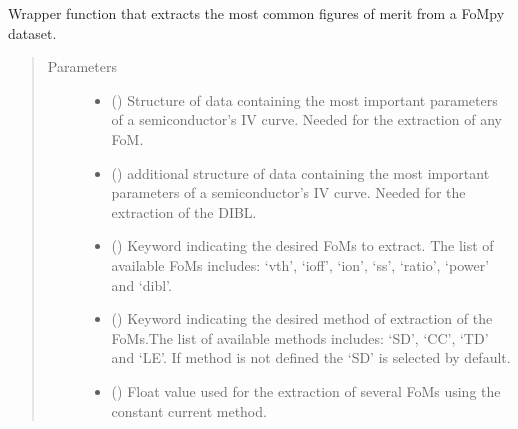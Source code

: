 \documentclass[letterpaper,10pt,english,openany, oneside]{sphinxmanual}
\begin{document}

\begin{fulllineitems}
\label{\detokenize{index:fompy.wrappers.extract}}
Wrapper function that extracts the most common figures of merit from a FoMpy dataset.
\begin{quote}\begin{description}
\item[{Parameters}] \leavevmode\begin{itemize}
\item {} 
 () \textendash{} Structure of data containing the most important parameters of a semiconductor’s IV curve.
Needed for the extraction of any FoM.

\item {} 
 () \textendash{} additional structure of data containing the most important parameters of a semiconductor’s IV curve.
Needed for the extraction of the DIBL.

\item {} 
 () \textendash{} Keyword indicating the desired FoMs to extract. The list of available FoMs includes:
‘vth’, ‘ioff’, ‘ion’, ‘ss’, ‘ratio’, ‘power’ and ‘dibl’.

\item {} 
 () \textendash{} Keyword indicating the desired method of extraction of the FoMs.The list of available methods includes:
‘SD’, ‘CC’, ‘TD’ and ‘LE’. If method is not defined the ‘SD’ is selected by default.

\item {} 
 (\sphinxstyleliteralemphasis{\sphinxupquote{, }}) \textendash{} Float value used for the extraction of several FoMs using the constant current method.


\end{itemize}
\end{description}
\end{quote}
\end{fulllineitems}
\end{document}
